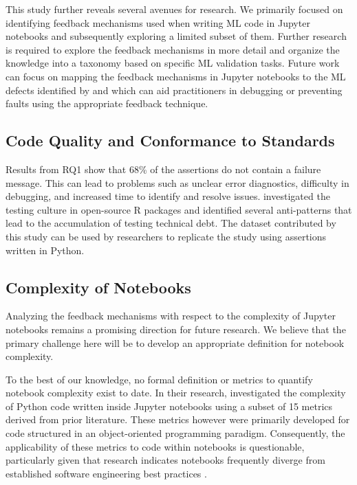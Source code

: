 \documentclass[smallextended]{svjour3}       %
\begin{document}
This study further reveals several avenues for research. We primarily focused on identifying feedback mechanisms used when writing ML code in Jupyter notebooks and subsequently exploring a limited subset of them. Further research is required to explore the feedback mechanisms in more detail and organize the knowledge into a taxonomy based on specific ML validation tasks. Future work can focus on mapping the feedback mechanisms in Jupyter notebooks to the ML defects identified by \citet{humbatova2020taxonomy} and \citet{morovati2023bugs} which can aid practitioners in debugging or preventing faults using the appropriate feedback technique.

\subsection{Code Quality and Conformance to Standards}

Results from RQ1 show that 68\% of the assertions do not contain a failure message. This can lead to problems such as unclear error diagnostics, difficulty in debugging, and increased time to identify and resolve issues. \citet{vidoni2021evaluating} investigated the testing culture in open-source R packages and identified several anti-patterns that lead to the accumulation of testing technical debt. The dataset contributed by this study can be used by researchers to replicate the \citet{vidoni2021evaluating} study using assertions written in Python.

\subsection{Complexity of Notebooks}

Analyzing the feedback mechanisms with respect to the complexity of Jupyter notebooks remains a promising direction for future research. We believe that the primary challenge here will be to develop an appropriate definition for notebook complexity.

To the best of our knowledge, no formal definition or metrics to quantify notebook complexity exist to date. In their research, \citet{grotov2022large-scale} investigated the complexity of Python code written inside Jupyter notebooks using a subset of 15 metrics derived from prior literature. These metrics however were primarily developed for code structured in an object-oriented programming paradigm. Consequently, the applicability of these metrics to code within notebooks is questionable, particularly given that research indicates notebooks frequently diverge from established software engineering best practices \cite{pimentel2019large-scale}.
\end{document}
